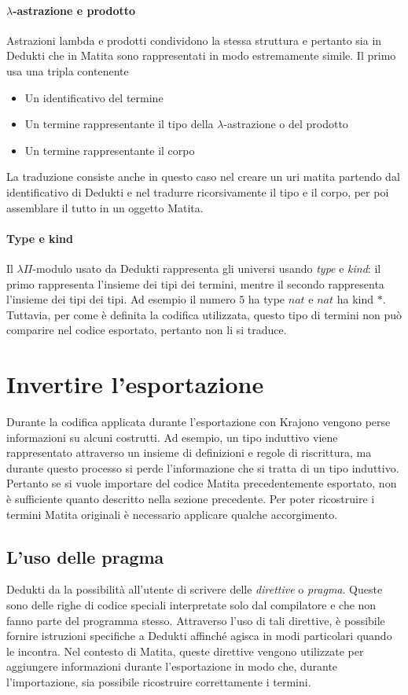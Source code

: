 \documentclass[12pt,a4paper]{mimosis}
\begin{document}
\paragraph{$\lambda$-astrazione e prodotto}
Astrazioni lambda e prodotti condividono la stessa struttura e pertanto sia in Dedukti
che in Matita sono rappresentati in modo estremamente simile.
Il primo usa una tripla contenente
\begin{itemize}
  \item Un identificativo del termine
  \item Un termine rappresentante il tipo della $\lambda$-astrazione o del prodotto
  \item Un termine rappresentante il corpo
\end{itemize}
La traduzione consiste anche in questo caso nel creare un uri matita partendo dal
identificativo di Dedukti e nel tradurre ricorsivamente il tipo e il corpo, per
poi assemblare il tutto in un oggetto Matita.

\paragraph{Type e kind}
Il $\lambda\Pi$-modulo usato da Dedukti rappresenta gli universi usando
\textit{type} e \textit{kind}: il primo rappresenta l'insieme dei tipi
dei termini, mentre il secondo rappresenta l'insieme dei tipi dei tipi.
Ad esempio il numero $5$ ha type $nat$ e $nat$ ha kind $*$.
Tuttavia, per come è definita la codifica utilizzata, questo tipo di
termini non può comparire nel codice esportato, pertanto non li si 
traduce.


\section{Invertire l'esportazione} \label{sezioneInvertireExport}
Durante la codifica applicata durante l'esportazione con Krajono vengono perse
informazioni su alcuni costrutti. Ad esempio, un tipo induttivo viene rappresentato
attraverso un insieme di definizioni e regole di riscrittura, ma durante questo processo
si perde l'informazione che si tratta di un tipo induttivo. Pertanto se si vuole 
importare del codice Matita precedentemente esportato, non è sufficiente quanto descritto
nella sezione precedente. Per poter ricostruire i termini Matita originali è necessario
applicare qualche accorgimento.

\subsection{L'uso delle pragma}
Dedukti da la possibilità all'utente di scrivere delle \textit{direttive} o \textit{pragma}.
Queste sono delle righe di codice speciali interpretate solo dal compilatore 
e che non fanno parte del programma stesso. Attraverso l'uso di tali direttive,
è possibile fornire istruzioni specifiche a Dedukti affinché agisca in modi
particolari quando le incontra. Nel contesto di Matita, queste direttive vengono
utilizzate per aggiungere informazioni durante l'esportazione in modo che,
durante l'importazione, sia possibile ricostruire correttamente i termini.
\end{document}
